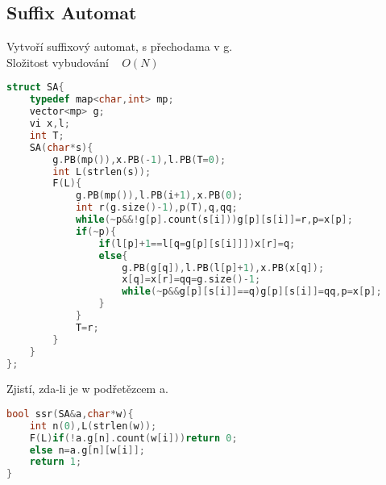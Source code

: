 \documentclass[11pt]{article}
\begin{document}
\subsection{Suffix Automat}
Vytvoří suffixový automat, s přechodama v \textsf{g}.
\\Složitost vybudování ~ $O(N)$
\begin{lstlisting}[language=C++]
struct SA{
    typedef map<char,int> mp;
    vector<mp> g;
    vi x,l;
    int T;
    SA(char*s){
        g.PB(mp()),x.PB(-1),l.PB(T=0);
        int L(strlen(s));
        F(L){
            g.PB(mp()),l.PB(i+1),x.PB(0);
            int r(g.size()-1),p(T),q,qq;
            while(~p&&!g[p].count(s[i]))g[p][s[i]]=r,p=x[p];
            if(~p){
                if(l[p]+1==l[q=g[p][s[i]]])x[r]=q;
                else{
                    g.PB(g[q]),l.PB(l[p]+1),x.PB(x[q]);
                    x[q]=x[r]=qq=g.size()-1;
                    while(~p&&g[p][s[i]]==q)g[p][s[i]]=qq,p=x[p];
                }
            }
            T=r;
        }
    }
};
\end{lstlisting}
Zjistí, zda-li je \textsf{w} podřetězcem \textsf{a}.
\begin{lstlisting}[language=C++]
bool ssr(SA&a,char*w){
    int n(0),L(strlen(w));
    F(L)if(!a.g[n].count(w[i]))return 0;
    else n=a.g[n][w[i]];
    return 1;
}
\end{lstlisting}
\end{document}
